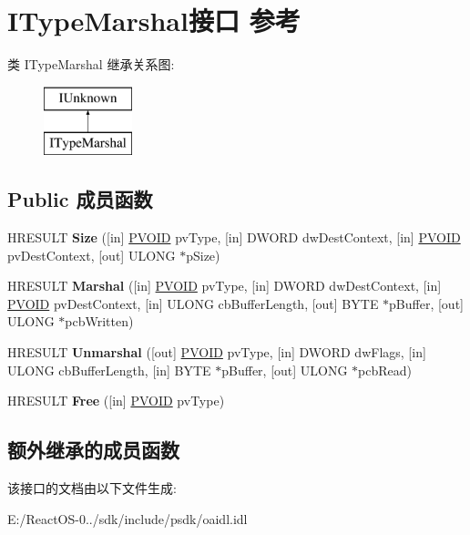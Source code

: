 \hypertarget{interface_i_type_marshal}{}\section{I\+Type\+Marshal接口 参考}
\label{interface_i_type_marshal}
类 I\+Type\+Marshal 继承关系图\+:\begin{figure}[H]
\begin{center}
\leavevmode
\includegraphics[height=2.000000cm]{interface_i_type_marshal}
\end{center}
\end{figure}
\subsection*{Public 成员函数}
\begin{DoxyCompactItemize}
\item 
\mbox{\label{interface_i_type_marshal_a9269a2f2a56bb103f344737f081eaa10}} 
H\+R\+E\+S\+U\+LT {\bfseries Size} (\mbox{[}in\mbox{]} \hyperlink{interfacevoid}{P\+V\+O\+ID} pv\+Type, \mbox{[}in\mbox{]} D\+W\+O\+RD dw\+Dest\+Context, \mbox{[}in\mbox{]} \hyperlink{interfacevoid}{P\+V\+O\+ID} pv\+Dest\+Context, \mbox{[}out\mbox{]} U\+L\+O\+NG $\ast$p\+Size)
\item 
\mbox{\label{interface_i_type_marshal_aa9906c7d1737e5deba9c98fdb45f8729}} 
H\+R\+E\+S\+U\+LT {\bfseries Marshal} (\mbox{[}in\mbox{]} \hyperlink{interfacevoid}{P\+V\+O\+ID} pv\+Type, \mbox{[}in\mbox{]} D\+W\+O\+RD dw\+Dest\+Context, \mbox{[}in\mbox{]} \hyperlink{interfacevoid}{P\+V\+O\+ID} pv\+Dest\+Context, \mbox{[}in\mbox{]} U\+L\+O\+NG cb\+Buffer\+Length, \mbox{[}out\mbox{]} B\+Y\+TE $\ast$p\+Buffer, \mbox{[}out\mbox{]} U\+L\+O\+NG $\ast$pcb\+Written)
\item 
\mbox{\label{interface_i_type_marshal_ad7647368dc74a0d1f07f37c032b4caee}} 
H\+R\+E\+S\+U\+LT {\bfseries Unmarshal} (\mbox{[}out\mbox{]} \hyperlink{interfacevoid}{P\+V\+O\+ID} pv\+Type, \mbox{[}in\mbox{]} D\+W\+O\+RD dw\+Flags, \mbox{[}in\mbox{]} U\+L\+O\+NG cb\+Buffer\+Length, \mbox{[}in\mbox{]} B\+Y\+TE $\ast$p\+Buffer, \mbox{[}out\mbox{]} U\+L\+O\+NG $\ast$pcb\+Read)
\item 
\mbox{\label{interface_i_type_marshal_a3ca70ae87d71ac899191aa92e77886bc}} 
H\+R\+E\+S\+U\+LT {\bfseries Free} (\mbox{[}in\mbox{]} \hyperlink{interfacevoid}{P\+V\+O\+ID} pv\+Type)
\end{DoxyCompactItemize}
\subsection*{额外继承的成员函数}


该接口的文档由以下文件生成\+:\begin{DoxyCompactItemize}
\item 
E\+:/\+React\+O\+S-\/0../sdk/include/psdk/oaidl.\+idl\end{DoxyCompactItemize}
